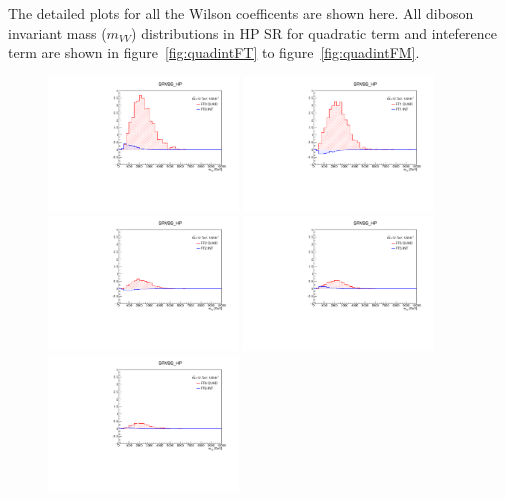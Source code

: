 The detailed plots for all the Wilson coefficents are shown here.
All diboson invariant mass ($m_{VV}$) distributions in HP SR for quadratic term and inteference term are shown in figure~\ref{fig:quadintFT} to figure~\ref{fig:quadintFM}.
\begin{figure}[]
    \centering
        \includegraphics[width=0.45\textwidth]{figures/aQGC/FT0_0ptag1pfat0pjet_0ptv_SRVBS_HP_MllJ.pdf}
        \includegraphics[width=0.45\textwidth]{figures/aQGC/FT1_0ptag1pfat0pjet_0ptv_SRVBS_HP_MllJ.pdf}
        \includegraphics[width=0.45\textwidth]{figures/aQGC/FT2_0ptag1pfat0pjet_0ptv_SRVBS_HP_MllJ.pdf}
        \includegraphics[width=0.45\textwidth]{figures/aQGC/FT5_0ptag1pfat0pjet_0ptv_SRVBS_HP_MllJ.pdf}
        \includegraphics[width=0.45\textwidth]{figures/aQGC/FT6_0ptag1pfat0pjet_0ptv_SRVBS_HP_MllJ.pdf}

\end{figure}
